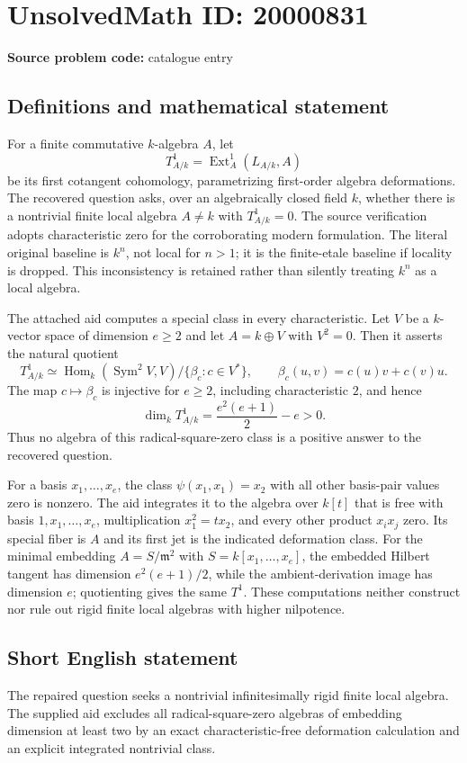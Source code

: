 \documentclass[11pt]{article}
\begin{document}
\section*{UnsolvedMath ID: 20000831}
\textbf{Source problem code:} catalogue entry
\subsection{Definitions and mathematical statement}
For a finite commutative $k$-algebra $A$, let
\[
T^1_{A/k}=\operatorname{Ext}^1_A(L_{A/k},A)
\]
be its first cotangent cohomology, parametrizing first-order algebra deformations. The recovered question asks, over an algebraically closed field $k$, whether there is a nontrivial finite local algebra $A\ne k$ with $T^1_{A/k}=0$. The source verification adopts characteristic zero for the corroborating modern formulation. The literal original baseline is $k^n$, not local for $n>1$; it is the finite-etale baseline if locality is dropped. This inconsistency is retained rather than silently treating $k^n$ as a local algebra.

The attached aid computes a special class in every characteristic. Let $V$ be a $k$-vector space of dimension $e\ge2$ and let $A=k\oplus V$ with $V^2=0$. Then it asserts the natural quotient
\[
T^1_{A/k}\simeq\operatorname{Hom}_k(\operatorname{Sym}^2V,V)\big/\{\beta_c:c\in V^*\},\qquad
\beta_c(u,v)=c(u)v+c(v)u.
\]
The map $c\mapsto\beta_c$ is injective for $e\ge2$, including characteristic $2$, and hence
\[
\dim_kT^1_{A/k}=\frac{e^2(e+1)}2-e>0.
\]
Thus no algebra of this radical-square-zero class is a positive answer to the recovered question.

For a basis $x_1,\ldots,x_e$, the class $\psi(x_1,x_1)=x_2$ with all other basis-pair values zero is nonzero. The aid integrates it to the algebra over $k[t]$ that is free with basis $1,x_1,\ldots,x_e$, multiplication $x_1^2=t x_2$, and every other product $x_ix_j$ zero. Its special fiber is $A$ and its first jet is the indicated deformation class. For the minimal embedding $A=S/\mathfrak m^2$ with $S=k[x_1,\ldots,x_e]$, the embedded Hilbert tangent has dimension $e^2(e+1)/2$, while the ambient-derivation image has dimension $e$; quotienting gives the same $T^1$. These computations neither construct nor rule out rigid finite local algebras with higher nilpotence.
\subsection{Short English statement}
The repaired question seeks a nontrivial infinitesimally rigid finite local algebra. The supplied aid excludes all radical-square-zero algebras of embedding dimension at least two by an exact characteristic-free deformation calculation and an explicit integrated nontrivial class.
\end{document}
